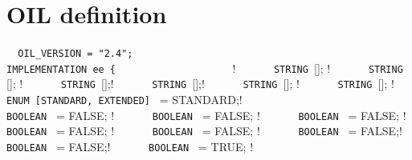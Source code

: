 \chapter{OIL definition}
\label{cha:oil-definition}

\noindent
\lstinline!  OIL_VERSION = "2.4";              ! \newline
\lstinline!                                    ! \newline
\lstinline!  IMPLEMENTATION ee {               ! \newline
\lstinline!    !\quad \quad{} {    ! \newline
\lstinline!      STRING ![]; ! \newline
\lstinline!      STRING ![]; ! \newline
\lstinline!      STRING ![];! \newline
\lstinline!      STRING ![];! \newline
\lstinline!      STRING ![]; ! \newline
\lstinline!      STRING ![];   ! \newline
\lstinline!                                    ! \newline
\lstinline!      ENUM [STANDARD, EXTENDED] ! = STANDARD;! \newline
\lstinline!                                    ! \newline
\lstinline!      BOOLEAN ! = FALSE;    ! \newline
\lstinline!      BOOLEAN ! = FALSE;      ! \newline
\lstinline!      BOOLEAN ! = FALSE;   ! \newline
\lstinline!      BOOLEAN ! = FALSE;    ! \newline
\lstinline!      BOOLEAN ! = FALSE;   ! \newline
\lstinline!      BOOLEAN ! = FALSE;! \newline
\lstinline!      BOOLEAN ! = FALSE;! \newline
\lstinline!      BOOLEAN ! = TRUE; ! \newline
\lstinline!      ! \newline
}
